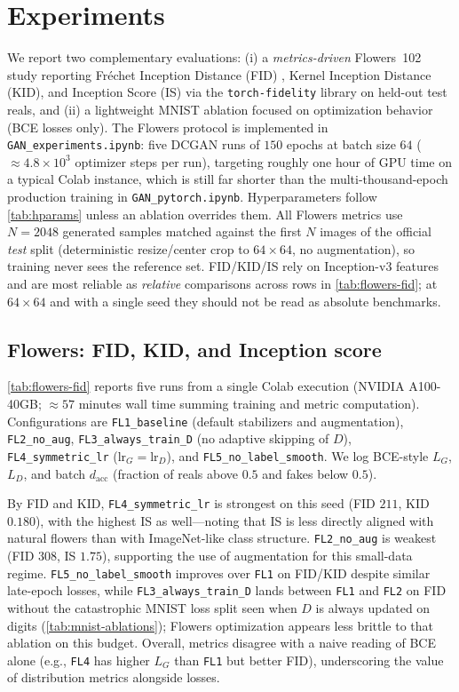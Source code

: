 \documentclass{article}
\theoremstyle{plain}
\theoremstyle{definition}
\theoremstyle{remark}
\begin{document}
\section{Experiments}
\label{sec:experiments}

We report two complementary evaluations: (i) a \emph{metrics-driven} Flowers~102 study reporting Fr\'echet Inception Distance (FID) \cite{Heusel2017GANs}, Kernel Inception Distance (KID), and Inception Score (IS) \cite{ImprovedGANs} via the \texttt{torch-fidelity} library on held-out test reals, and (ii) a lightweight MNIST ablation focused on optimization behavior (BCE losses only). The Flowers protocol is implemented in \texttt{GAN\_experiments.ipynb}: five DCGAN runs of $150$ epochs at batch size $64$ ($\approx 4.8\times 10^3$ optimizer steps per run), targeting roughly one hour of GPU time on a typical Colab instance, which is still far shorter than the multi-thousand-epoch production training in \texttt{GAN\_pytorch.ipynb}. Hyperparameters follow \cref{tab:hparams} unless an ablation overrides them. All Flowers metrics use $N=2048$ generated samples matched against the first $N$ images of the official \emph{test} split (deterministic resize/center crop to $64\times 64$, no augmentation), so training never sees the reference set. FID/KID/IS rely on Inception-v3 features and are most reliable as \emph{relative} comparisons across rows in \cref{tab:flowers-fid}; at $64\times 64$ and with a single seed they should not be read as absolute benchmarks.

\subsection{Flowers: FID, KID, and Inception score}

\cref{tab:flowers-fid} reports five runs from a single Colab execution (NVIDIA A100-40GB; $\approx 57$ minutes wall time summing training and metric computation). Configurations are \texttt{FL1\_baseline} (default stabilizers and augmentation), \texttt{FL2\_no\_aug}, \texttt{FL3\_always\_train\_D} (no adaptive skipping of $D$), \texttt{FL4\_symmetric\_lr} ($\mathrm{lr}_G=\mathrm{lr}_D$), and \texttt{FL5\_no\_label\_smooth}. We log BCE-style $L_G$, $L_D$, and batch $d_{\mathrm{acc}}$ (fraction of reals above $0.5$ and fakes below $0.5$).

By FID and KID, \texttt{FL4\_symmetric\_lr} is strongest on this seed (FID $211$, KID $0.180$), with the highest IS as well---noting that IS is less directly aligned with natural flowers than with ImageNet-like class structure. \texttt{FL2\_no\_aug} is weakest (FID $308$, IS $1.75$), supporting the use of augmentation for this small-data regime. \texttt{FL5\_no\_label\_smooth} improves over \texttt{FL1} on FID/KID despite similar late-epoch losses, while \texttt{FL3\_always\_train\_D} lands between \texttt{FL1} and \texttt{FL2} on FID without the catastrophic MNIST loss split seen when $D$ is always updated on digits (\cref{tab:mnist-ablations}); Flowers optimization appears less brittle to that ablation on this budget. Overall, metrics disagree with a naive reading of BCE alone (e.g., \texttt{FL4} has higher $L_G$ than \texttt{FL1} but better FID), underscoring the value of distribution metrics alongside losses.
\end{document}
